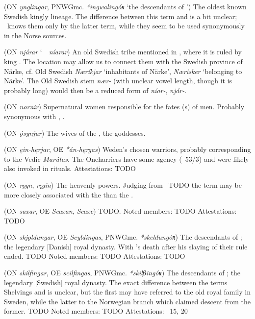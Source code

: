\begin{itemize}
 (ON \emph{ynglingar}, PNWGmc. \emph{*ingwalingóʀ} ‘the descendants of ’)
  The oldest known Swedish kingly lineage. The difference between this term and  is a bit unclear; \Beowulf\ knows them only by the latter term, while they seem to be used synonymously in the Norse sources.

 (ON \emph{njárar} \char`~\ \emph{níarar})
  An old Swedish tribe mentioned in \Volundarkvida, where it is ruled by king .  The location may allow us to connect them with the Swedish province of Närke, cf. Old Swedish \emph{Næríkjar} ‘inhabitants of Närke’, \emph{Nærisker} ‘belonging to Närke’.  The Old Swedish stem \emph{nær-} (with unclear vowel length, though it is probably long) would then be a reduced form of \emph{níar-}, \emph{njár-}.

 (ON \emph{nornir})
  Supernatural women responsible for the fates (s) of men.  Probably synonymous with , .

 (ON \emph{ǫ́synjur})
  The wives of the , the goddesses.

 (ON \emph{ęin-hęrjar}, OE \emph{*án-hęrgas})
  Weden’s chosen warriors, probably corresponding to the Vedic \emph{Marútas}.  The Oneharriers have some agency (\Grimnismal\ 53/3) and were likely also invoked in rituals.
  Attestations: TODO

 (ON \emph{rǫgn}, \emph{ręgin})
  The heavenly powers.  Judging from \Vafthrudnismal\ TODO the term may be more closely associated with the  than the .

 (ON \emph{saxar}, OE \emph{Seaxan}, \emph{Seaxe})
  TODO.
  Noted members: TODO
  Attestations: TODO

 (ON \emph{skjǫldungar}, OE \emph{Scyldingas}, PNWGmc. \emph{*skeldungóʀ})
  The descendants of ; the legendary [Danish] royal dynasty. With ’s death after his slaying of  their rule ended. TODO
  Noted members: TODO
  Attestations: TODO

 (ON \emph{skilfingar}, OE \emph{scilfingas}, PNWGmc. \emph{*skilβingóʀ})
  The descendants of ; the legendary [Swedish] royal dynasty. The exact difference between the terms Shelvings and  is unclear, but the first may have referred to the old royal family in Sweden, while the latter to the Norwegian branch which claimed descent from the former. TODO
  Noted members: TODO
  Attestations: \Hyndluljod\ 15, 20


\end{itemize}
